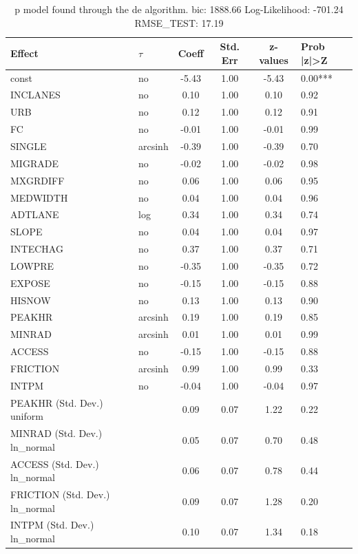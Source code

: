 \begin{table}
	\caption{p model found through the de algorithm. bic: 1888.66 Log-Likelihood: -701.24 RMSE_TEST: 17.19}
	\begin{center}
		\begin{tabular}{|l|l|c|c|c|l|}
			\hline
			Effect & $\tau$ & Coeff & Std. Err & z-values & Prob |z|>Z \\
			\hline
			const & no & -5.43 & 1.00 & -5.43 & 0.00*** \\
			\hline
			INCLANES & no & 0.10 & 1.00 & 0.10 & 0.92 \\
			\hline
			URB & no & 0.12 & 1.00 & 0.12 & 0.91 \\
			\hline
			FC & no & -0.01 & 1.00 & -0.01 & 0.99 \\
			\hline
			SINGLE & arcsinh & -0.39 & 1.00 & -0.39 & 0.70 \\
			\hline
			MIGRADE & no & -0.02 & 1.00 & -0.02 & 0.98 \\
			\hline
			MXGRDIFF & no & 0.06 & 1.00 & 0.06 & 0.95 \\
			\hline
			MEDWIDTH & no & 0.04 & 1.00 & 0.04 & 0.96 \\
			\hline
			ADTLANE & log & 0.34 & 1.00 & 0.34 & 0.74 \\
			\hline
			SLOPE & no & 0.04 & 1.00 & 0.04 & 0.97 \\
			\hline
			INTECHAG & no & 0.37 & 1.00 & 0.37 & 0.71 \\
			\hline
			LOWPRE & no & -0.35 & 1.00 & -0.35 & 0.72 \\
			\hline
			EXPOSE & no & -0.15 & 1.00 & -0.15 & 0.88 \\
			\hline
			HISNOW & no & 0.13 & 1.00 & 0.13 & 0.90 \\
			\hline
			PEAKHR & arcsinh & 0.19 & 1.00 & 0.19 & 0.85 \\
			\hline
			MINRAD & arcsinh & 0.01 & 1.00 & 0.01 & 0.99 \\
			\hline
			ACCESS & no & -0.15 & 1.00 & -0.15 & 0.88 \\
			\hline
			FRICTION & arcsinh & 0.99 & 1.00 & 0.99 & 0.33 \\
			\hline
			INTPM & no & -0.04 & 1.00 & -0.04 & 0.97 \\
			\hline
			PEAKHR (Std. Dev.) uniform &  & 0.09 & 0.07 & 1.22 & 0.22 \\
			\hline
			MINRAD (Std. Dev.) ln_normal &  & 0.05 & 0.07 & 0.70 & 0.48 \\
			\hline
			ACCESS (Std. Dev.) ln_normal &  & 0.06 & 0.07 & 0.78 & 0.44 \\
			\hline
			FRICTION (Std. Dev.) ln_normal &  & 0.09 & 0.07 & 1.28 & 0.20 \\
			\hline
			INTPM (Std. Dev.) ln_normal &  & 0.10 & 0.07 & 1.34 & 0.18 \\
			\hline
		\end{tabular}
	\end{center}
\end{table}